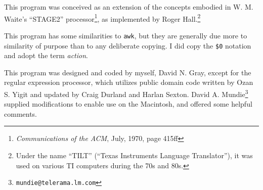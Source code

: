 This program was conceived as an extension of the concepts
embodied in W. M. Waite's ``STAGE2'' processor\footnote{{\em
Communications of the ACM}, July, 1970, page 415ff}, as implemented by
Roger Hall.\footnote{Under the name ``TILT'' (``Texas Instruments
Language Translator''), it was used on various TI computers during the
70s and 80s.}

This program has some similarities to {\tt awk}, but
they are generally due more to similarity of purpose than to any
deliberate copying.  I did copy the \verb/$0/ notation and adopt the term
{\em action}.

This program was designed and coded by myself, David N. Gray, except for the
regular expression processor, which utilizes public domain code written
by Ozan S. Yigit and updated by Craig Durland and Harlan Sexton.
David A. Mundie\footnote{\tt mundie@telerama.lm.com} supplied modifications
to enable use on the Macintosh, and offered some helpful comments.
